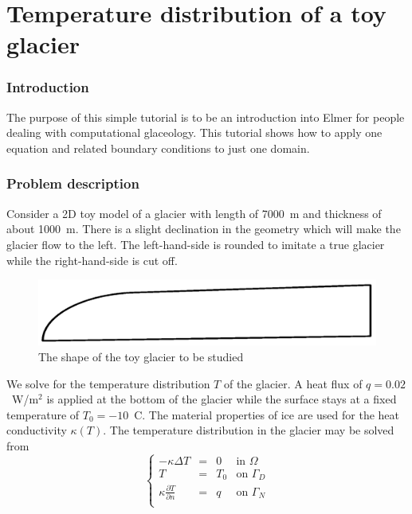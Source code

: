 \chapter{Temperature distribution of a toy glacier}



\subsection*{Introduction}

The purpose of this simple tutorial is to be an introduction into Elmer for people dealing with computational glaceology.
This tutorial shows how to apply one equation and related boundary conditions to just one domain.


\subsection*{Problem description}

Consider a 2D toy model of a glacier with length of 7000~m and thickness of about 1000~m. 
There is a slight declination in the geometry which will make the glacier flow to the left. 
The left-hand-side is rounded to imitate a true glacier while the right-hand-side is 
cut off. 

\begin{figure}
\begin{center}
\includegraphics[width=120mm]{glacier_toy_shape}
\caption{The shape of the toy glacier to be studied}\label{glac:shape}
\end{center}
\end{figure}

We solve for the temperature distribution $T$ of the glacier. 
A heat flux of $q=0.02$~W/m$^2$ is applied at the bottom of the glacier while the surface stays at a
fixed temperature of $T_0=-10$~C. The material properties of ice are used for the 
heat conductivity $\kappa(T)$. 
The temperature distribution in the glacier 
may be solved from
\begin{equation}
\left \{
\begin{array}{cccc}
- \kappa \Delta T &= & 0 & \mathrm{ in } \, \, \Omega \\
T&=&T_0 & \mathrm{ on } \, \, \Gamma_D \\
\kappa \frac{\partial T}{\partial n} &=& q & \mathrm{ on } \,\, \Gamma_N \\
\end{array}
\right .
\end{equation}

